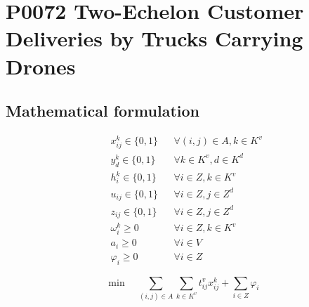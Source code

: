 \documentclass[10pt]{article}
\begin{document}
\section*{P0072 Two-Echelon Customer Deliveries by Trucks Carrying Drones}
\subsection*{Mathematical formulation}
\[
\begin{aligned}
&x^k_{ij} \in \{0, 1\} && \forall (i,j) \in A, k \in K^v \\
&y^k_d \in \{0, 1\} && \forall k \in K^v, d \in K^d \\
&h^k_i \in \{0, 1\} && \forall i \in Z, k \in K^v \\
&u_{ij} \in \{0, 1\} && \forall i \in Z, j \in Z^d \\
&z_{ij} \in \{0, 1\} && \forall i \in Z, j \in Z^d \\
&\omega^k_i \ge 0 && \forall i \in Z, k \in K^v \\
&a_i \ge 0 && \forall i \in V \\
&\varphi_i \ge 0 && \forall i \in Z
\end{aligned}
\]

\[
\min\quad\sum_{(i,j)\in A}\sum_{k\in K^v}t^v_{ij}x^k_{ij}
+\sum_{i\in Z}\varphi_i
\]
\end{document}
